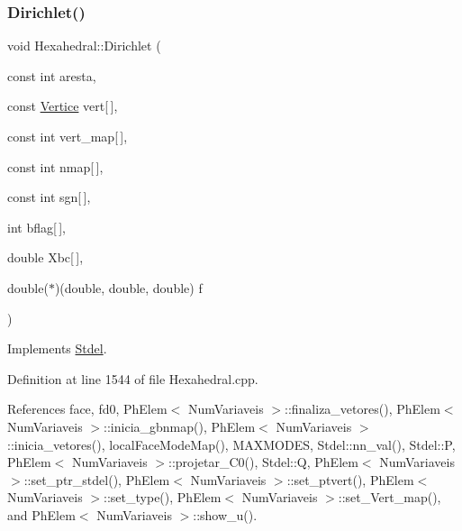 \subsubsection{\texorpdfstring{Dirichlet()}{Dirichlet()}}
{\footnotesize\ttfamily void Hexahedral\+::\+Dirichlet (\begin{DoxyParamCaption}\item[{const int}]{aresta,  }\item[{const \hyperlink{structVertice}{Vertice}}]{vert\mbox{[}$\,$\mbox{]},  }\item[{const int}]{vert\+\_\+map\mbox{[}$\,$\mbox{]},  }\item[{const int}]{nmap\mbox{[}$\,$\mbox{]},  }\item[{const int}]{sgn\mbox{[}$\,$\mbox{]},  }\item[{int}]{bflag\mbox{[}$\,$\mbox{]},  }\item[{double}]{Xbc\mbox{[}$\,$\mbox{]},  }\item[{double($\ast$)(double, double, double)}]{f }\end{DoxyParamCaption})\hspace{0.3cm}{\ttfamily [virtual]}}



Implements \hyperlink{classStdel_a92e13b000249ba73b35407d925cbd7a8}{Stdel}.



Definition at line 1544 of file Hexahedral.\+cpp.



References face, fd0, Ph\+Elem$<$ Num\+Variaveis $>$\+::finaliza\+\_\+vetores(), Ph\+Elem$<$ Num\+Variaveis $>$\+::inicia\+\_\+gbnmap(), Ph\+Elem$<$ Num\+Variaveis $>$\+::inicia\+\_\+vetores(), local\+Face\+Mode\+Map(), M\+A\+X\+M\+O\+D\+ES, Stdel\+::nn\+\_\+val(), Stdel\+::P, Ph\+Elem$<$ Num\+Variaveis $>$\+::projetar\+\_\+\+C0(), Stdel\+::Q, Ph\+Elem$<$ Num\+Variaveis $>$\+::set\+\_\+ptr\+\_\+stdel(), Ph\+Elem$<$ Num\+Variaveis $>$\+::set\+\_\+ptvert(), Ph\+Elem$<$ Num\+Variaveis $>$\+::set\+\_\+type(), Ph\+Elem$<$ Num\+Variaveis $>$\+::set\+\_\+\+Vert\+\_\+map(), and Ph\+Elem$<$ Num\+Variaveis $>$\+::show\+\_\+u().

